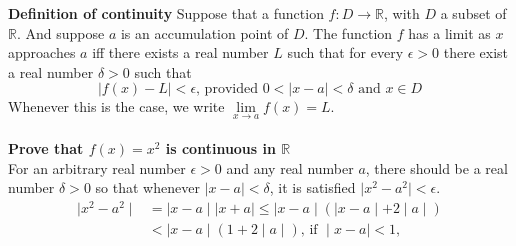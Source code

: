 \documentclass[12pt]{article}
\newcommand{\R}{\mathbb{R}}
\begin{document}
\textbf{Definition of continuity}
Suppose that a function $f:D\to \R$, with $D$ a subset of $\R$. And suppose $a$ is an accumulation point of $D$. The function $f$ has a limit as $x$ approaches $a$ iff there exists a real number $L$ such that for every $\epsilon>0$ there exist a real number $\delta>0$ such that
$$\mid f(x)-L\mid<\epsilon\text{, provided } 0<\mid x-a\mid<\delta\text{ and } x\in D$$
Whenever this is the case, we write $\lim\limits_{x\to a}f(x)=L$.\\\\
\textbf{Prove that $f(x)=x^2$ is continuous in $\R$}\\
For an arbitrary real number $\epsilon>0$ and any real number $a$, there should be a real number $\delta>0$ so that whenever $\mid x-a\mid<\delta$, it is satisfied $\mid x^2-a^2\mid<\epsilon$.
\begin{align*}
\mid x^2-a^2\mid & = \mid x-a\mid\mid x+a\mid\leq\mid x-a\mid(\mid x-a\mid+2\mid a\mid)\\
                 & < \mid x-a\mid(1+2\mid a\mid)\text{, if }\mid x-a\mid<1,
\end{align*}
\end{document}
